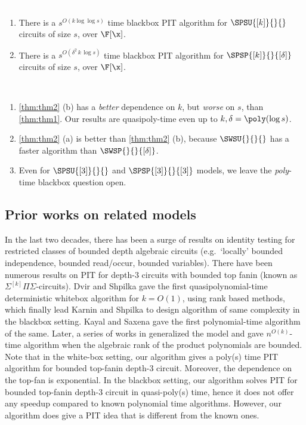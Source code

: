 \begin{theorem}\label{thm:thm2}
    \textcolor{white}{.}
    \begin{enumerate}[label={(\alph*)}]
        \item There is a $s^{O(k \log \log s)}$ time blackbox PIT algorithm for $\SPSU{[k]}{}{}$ circuits of size $s$, over $\F[\x]$.
        \item There is a $s^{O(\delta^2\,k\,\log s)}$ time blackbox PIT algorithm for $\SPSP{[k]}{}{[\delta]}$ circuits of size $s$, over $\F[\x]$.
    \end{enumerate}
\end{theorem}

\begin{remark*} ~ 
    \begin{enumerate}
    \setlength\itemsep{.1em}
        \item \autoref{thm:thm2} (b) has a \emph{better} dependence on $k$, but \emph{worse} on $s$, than \autoref{thm:thm1}. Our results are quasipoly-time even up to $k,\delta = \poly(\log s)$.
        \item \autoref{thm:thm2} (a) is better than \autoref{thm:thm2} (b), because $\SWSU{}{}{}$ has a faster algorithm than $\SWSP{}{}{[\delta]}$. 
%
        \item Even for $\SPSU{[3]}{}{}$ and $\SPSP{[3]}{}{[3]}$ models, we leave the {\em poly}-time blackbox question open. 
    \end{enumerate}
\end{remark*}

\subsection{Prior works on related models}  

In the last two decades, there has been a surge of results on identity testing for restricted
classes of bounded depth algebraic circuits (e.g.~`locally' bounded independence, bounded read/occur, bounded variables). There have been numerous results on PIT for depth-3 circuits with bounded
top fanin (known as $\Sigma^{[k]}\Pi\Sigma$-circuits). Dvir and Shpilka \cite{dvir2007locally} gave the first quasipolynomial-time deterministic whitebox algorithm for $k=O(1)$, using rank based methods, which finally lead Karnin and Shpilka \cite{karnin2011black} to design algorithm of same complexity in the blackbox setting. Kayal and Saxena \cite{kayal2007polynomial} gave the first polynomial-time algorithm of the same. Later, a series of works 
in \cite{saxena2011almost,saxena2012blackbox,saxena2013sylvester, agrawal2016jacobian} generalized the model and gave $n^{O(k)}$-time algorithm when the algebraic rank of the product polynomials are bounded. Note that in the white-box setting, our algorithm gives a poly(s) time PIT algorithm for bounded top-fanin depth-3 circuit. Moreover, the dependence on the top-fan is exponential. In the blackbox setting, our algorithm solves PIT for bounded top-fanin depth-3 circuit in quasi-poly(s) time, hence it does not offer any speedup compared to known polynomial time algorithms. However, our algorithm does give a PIT idea that is different from the known ones.

